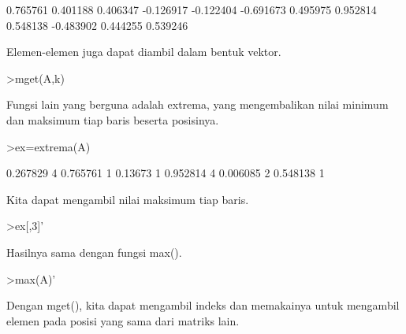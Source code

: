 \documentclass[a4paper,10pt]{article}
\begin{document}
\begin{eulernotebook}
\begin{eulercomment}
\begin{eulercomment}
\begin{eulercomment}
\begin{eulercomment}
\begin{eulercomment}
\begin{eulercomment}
\begin{eulercomment}
\begin{eulercomment}
\begin{eulercomment}
\begin{eulercomment}
\begin{eulercomment}
\begin{eulercomment}
\begin{eulerprompt}
\end{eulerprompt}
\begin{euleroutput}
       0.765761      0.401188      0.406347     -0.126917 
      -0.122404     -0.691673      0.495975      0.952814 
       0.548138     -0.483902      0.444255      0.539246 
\end{euleroutput}
\begin{eulercomment}
Elemen-elemen juga dapat diambil dalam bentuk vektor.
\end{eulercomment}
\begin{eulerprompt}
>mget(A,k)
\end{eulerprompt}
\begin{euleroutput}
  [0.267829,  0.13673,  0.390567,  0.006085]
\end{euleroutput}
\begin{eulercomment}
Fungsi lain yang berguna adalah extrema, yang mengembalikan nilai minimum
dan maksimum tiap baris beserta posisinya.
\end{eulercomment}
\begin{eulerprompt}
>ex=extrema(A)
\end{eulerprompt}
\begin{euleroutput}
       0.267829             4      0.765761             1 
        0.13673             1      0.952814             4 
       0.006085             2      0.548138             1 
\end{euleroutput}
\begin{eulercomment}
Kita dapat mengambil nilai maksimum tiap baris.
\end{eulercomment}
\begin{eulerprompt}
>ex[,3]'
\end{eulerprompt}
\begin{euleroutput}
  [0.765761,  0.952814,  0.548138]
\end{euleroutput}
\begin{eulercomment}
Hasilnya sama dengan fungsi max().
\end{eulercomment}
\begin{eulerprompt}
>max(A)'
\end{eulerprompt}
\begin{euleroutput}
  [0.765761,  0.952814,  0.548138]
\end{euleroutput}
\begin{eulercomment}
Dengan mget(), kita dapat mengambil indeks dan memakainya untuk mengambil
elemen pada posisi yang sama dari matriks lain.
\end{eulercomment}

\end{eulercomment}
\end{eulercomment}
\end{eulercomment}
\end{eulercomment}
\end{eulercomment}
\end{eulercomment}
\end{eulercomment}
\end{eulercomment}
\end{eulercomment}
\end{eulercomment}
\end{eulercomment}
\end{eulercomment}
\end{eulernotebook}
\end{document}
